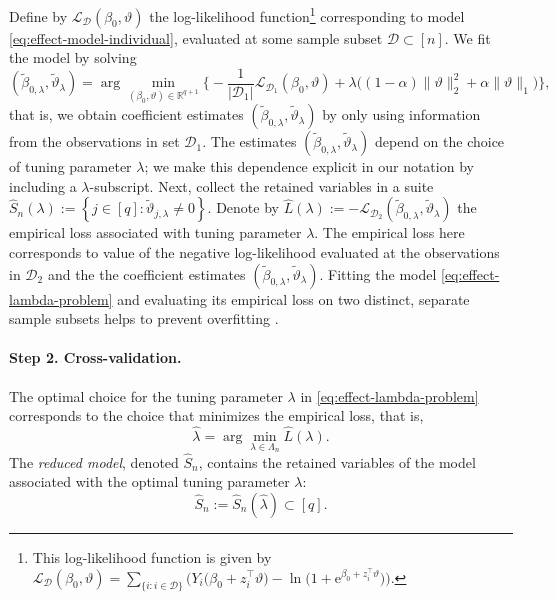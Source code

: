 \documentclass[11pt]{article}
\newcommand{\R}{\mathbb{R}}
\newcommand{\D}{\mathcal{D}}
\newcommand{\e}{\text{e}}
\begin{document}
Define by $\mathcal{L}_{\mathcal{D}}(\beta_0, \vartheta)$ the log-likelihood function\footnote{This log-likelihood function is given by $\mathcal{L}_{\mathcal{D}}(\beta_0, \vartheta) = \sum_{\{ i:i \in \D \}} \Big( Y_i \big(\beta_0 + z_i^\top \vartheta \big) - \ln\big( 1 + \e^{\beta_0 + z_i^\top \vartheta} \big)\Big)$.} corresponding to model \eqref{eq:effect-model-individual}, evaluated at some sample subset $\mathcal{D}\subset [n]$. We fit the model by solving
\begin{equation} \label{eq:effect-lambda-problem}
    (\widetilde{\beta}_{0,\lambda}, \widetilde{\vartheta}_\lambda)
    =
    \arg\min_{(\beta_0, \vartheta) \in \R^{q+1}}
    \Bigg\{
    - \frac{1}{|\D_1|} \mathcal{L}_{\D_1}(\beta_0, \vartheta) 
    + 
    \lambda \Big( 
    (1-\alpha) \| \vartheta \|_2^2 + \alpha \|\vartheta \|_1
    \Big)
    \Bigg\},
\end{equation}
that is, we obtain coefficient estimates $(\widetilde{\beta}_{0,\lambda}, \widetilde{\vartheta}_\lambda)$ by only using information from the observations in set $\D_1$. The estimates $(\widetilde{\beta}_{0,\lambda}, \widetilde{\vartheta}_\lambda)$ depend on the choice of tuning parameter $\lambda$; we make this dependence explicit in our notation by including a $\lambda$-subscript. Next, collect the retained variables in a suite $\widehat{S}_n(\lambda) := \left\{ j \in [q]: \widetilde{\vartheta}_{j,\lambda} \neq 0 \right\}$. Denote by $\widehat{L}(\lambda) := - \mathcal{L}_{\D_2}(\widetilde{\beta}_{0,\lambda}, \widetilde{\vartheta}_\lambda)$ the empirical loss associated with tuning parameter $\lambda$. The empirical loss here corresponds to value of the negative log-likelihood evaluated at the observations in $\D_2$ and the the coefficient estimates $(\widetilde{\beta}_{0,\lambda}, \widetilde{\vartheta}_\lambda)$. Fitting the model \eqref{eq:effect-lambda-problem} and evaluating  its empirical loss on two distinct, separate sample subsets helps to prevent overfitting \citep{wasserman2009high}.

\paragraph{Step 2. Cross-validation.} The optimal choice for the tuning parameter $\lambda$ in \eqref{eq:effect-lambda-problem} corresponds to the choice that minimizes the empirical loss, that is,
\[
    \widehat{\lambda} = \arg \min_{\lambda\in\Lambda_n} \widehat{L}(\lambda).
\]
The \textit{reduced model}, denoted $\widehat{S}_n$, contains the retained variables of the model associated with the optimal tuning parameter $\lambda$:
\[
    \widehat{S}_n := \widehat{S}_n(\widehat{\lambda}) \subset [q].
\]
\end{document}
